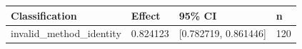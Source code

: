 \begin{tabular}{llll}
\hline
Classification & Effect & 95\% CI & n \\
\hline
invalid\_method\_identity & 0.824123 & [0.782719, 0.861446] & 120 \\
\hline
\end{tabular}
